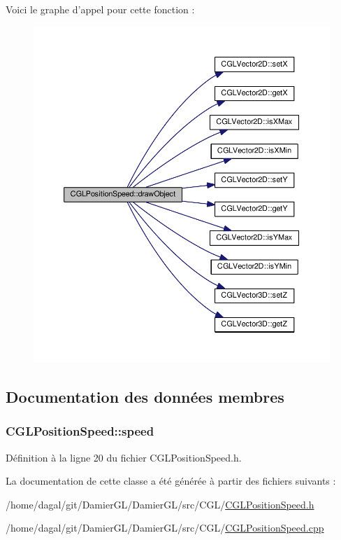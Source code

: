Voici le graphe d'appel pour cette fonction \-:\nopagebreak
\begin{figure}[H]
\begin{center}
\leavevmode
\includegraphics[width=350pt]{d7/dc4/class_c_g_l_position_speed_ac2a548b1df4418be822a62d623fdd1ec_cgraph}
\end{center}
\end{figure}




\subsection{Documentation des données membres}
\hypertarget{class_c_g_l_position_speed_afbc395f2372e9581e4fa0cdc7e684411}{
\subsubsection[{speed}]{ C\-G\-L\-Position\-Speed\-::speed\hspace{0.3cm}{\ttfamily [protected]}}}\label{class_c_g_l_position_speed_afbc395f2372e9581e4fa0cdc7e684411}


Définition à la ligne 20 du fichier C\-G\-L\-Position\-Speed.\-h.



La documentation de cette classe a été générée à partir des fichiers suivants \-:\begin{DoxyCompactItemize}
\item 
/home/dagal/git/\-Damier\-G\-L/\-Damier\-G\-L/src/\-C\-G\-L/\hyperlink{_c_g_l_position_speed_8h}{C\-G\-L\-Position\-Speed.\-h}\item 
/home/dagal/git/\-Damier\-G\-L/\-Damier\-G\-L/src/\-C\-G\-L/\hyperlink{_c_g_l_position_speed_8cpp}{C\-G\-L\-Position\-Speed.\-cpp}\end{DoxyCompactItemize}
